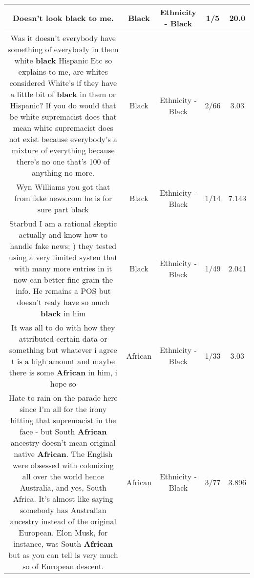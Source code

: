 \documentclass[11pt]{article}
\newlength\mylength
\begin{document}
\begin{center}
\begin{longtable}{|C{.65\mylength}|C{.30\mylength}|C{.12\mylength}|C{.12\mylength}|C{.12\mylength}|}
  \small Doesn't look \textbf{black} to me.\normalsize   & Black & Ethnicity - Black & 1/5 & 20.0 \\  \hline
  \small Was it doesn't everybody have something of everybody in them white \textbf{black} Hispanic Etc so explains to me, are whites considered White's if they have a little bit of \textbf{black} in them or Hispanic? If you do would that be white supremacist does that mean white supremacist does not exist because everybody's a mixture of everything because there's no one that's 100 of anything no more.\normalsize   & Black & Ethnicity - Black & 2/66 & 3.03 \\  \hline
  \small Wyn Williams you got that from fake news.com he is for sure part black\normalsize   & Black & Ethnicity - Black & 1/14 & 7.143 \\  \hline
  \small Starbud I am a rational skeptic actually and know how to handle fake news; ) they tested using a very limited systen that with many more entries in it now can better fine grain the info. He remains a POS but doesn't realy have so much \textbf{black} in him\normalsize   & Black & Ethnicity - Black & 1/49 & 2.041 \\  \hline
  \small It was all to do with how they attributed certain data or something but whatever i agree t is a high amount and maybe there is some \textbf{African} in him, i hope so\normalsize   & African & Ethnicity - Black & 1/33 & 3.03 \\  \hline
  \small Hate to rain on the parade here since I'm all for the irony hitting that supremacist in the face - but South \textbf{African} ancestry doesn't mean original native \textbf{African}. The English were obsessed with colonizing all over the world hence Australia, and yes, South Africa. It's almost like saying somebody has Australian ancestry instead of the original European. Elon Musk, for instance, was South \textbf{African} but as you can tell is very much so of European descent.\normalsize   & African & Ethnicity - Black & 3/77 & 3.896 \\  \hline

\end{longtable}
\end{center}
\end{document}
